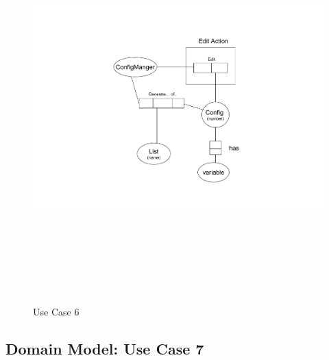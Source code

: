 \begin{figure}[htbp]
  \centering
  \includegraphics[angle=0,width=15cm,height=15cm]{"domainmodel-usecase6"}
  \caption{Use Case 6}
  \label{fig:usecase6}
\end{figure}

\newpage
\subsection{Domain Model: Use Case 7}

